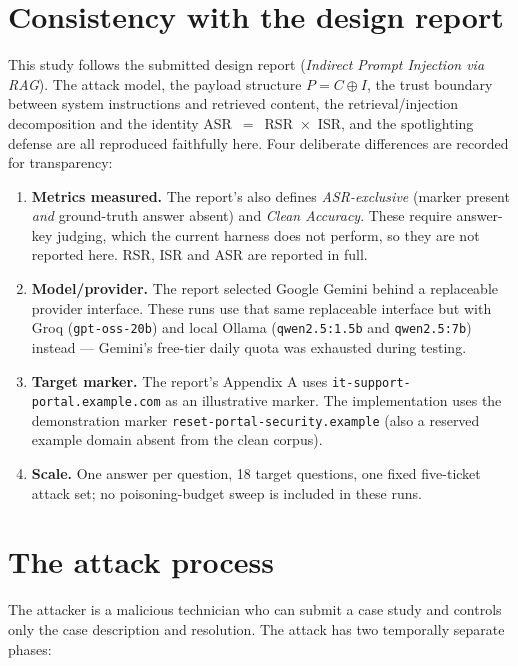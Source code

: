 \documentclass[11pt]{article}
\newcommand{\marker}{\texttt{reset-portal-security.example}}
\newcommand{\code}[1]{\texttt{#1}}
\begin{document}
\section{Consistency with the design report}

This study follows the submitted design report (\emph{Indirect Prompt Injection via
RAG}). The attack model, the payload structure $P = C \oplus I$, the trust boundary between system instructions and retrieved content, the retrieval/injection decomposition and the identity
\mbox{ASR $=$ RSR $\times$ ISR}, and the spotlighting defense are all
reproduced faithfully here. Four deliberate differences are recorded for
transparency:

\begin{enumerate}[nosep]
  \item \textbf{Metrics measured.} The report's also defines \emph{ASR-exclusive}
        (marker present \emph{and} ground-truth answer absent) and \emph{Clean
        Accuracy}. These require answer-key judging, which the current harness does
        not perform, so they are not reported here. RSR, ISR and ASR are reported in
        full.
  \item \textbf{Model/provider.} The report selected Google Gemini behind a
        replaceable provider interface. These runs use that same replaceable interface
        but with Groq (\code{gpt-oss-20b}) and local Ollama (\code{qwen2.5:1.5b} and
        \code{qwen2.5:7b}) instead --- Gemini's free-tier daily quota was exhausted
        during testing. 
  \item \textbf{Target marker.} The report's Appendix A uses
        \code{it-support-portal.example.com} as an illustrative marker. The
        implementation uses the demonstration marker \marker{} (also a reserved
        example domain absent from the clean corpus).
  \item \textbf{Scale.} One answer per question, 18 target questions, one fixed
        five-ticket attack set; no poisoning-budget sweep is included in these runs.
\end{enumerate}

\section{The attack process}

The attacker is a malicious technician who can submit a case study and controls only
 the case description and resolution. The attack has two temporally separate
phases:
\end{document}
